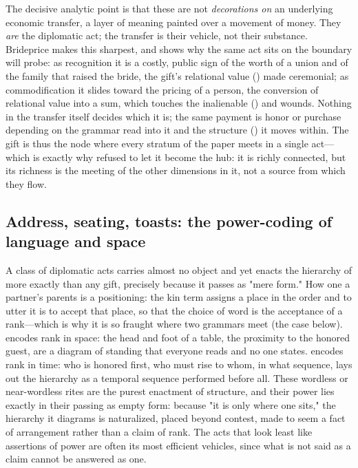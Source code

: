 The decisive analytic point is that these are not \emph{decorations on} an underlying economic transfer, a layer of meaning painted over a movement of money. They \emph{are} the diplomatic act; the transfer is their vehicle, not their substance. Brideprice makes this sharpest, and shows why the same act sits on the boundary  will probe: as recognition it is a costly, public sign of the worth of a union and of the family that raised the bride, the gift's relational value () made ceremonial; as commodification it slides toward the pricing of a person, the conversion of relational value into a sum, which touches the inalienable () and wounds. Nothing in the transfer itself decides which it is; the same payment is honor or purchase depending on the grammar read into it and the structure () it moves within. The gift is thus the node where every stratum of the paper meets in a single act---which is exactly why  refused to let it become the hub: it is richly connected, but its richness is the meeting of the other dimensions in it, not a source from which they flow.

\subsection{Address, seating, toasts: the power-coding of language and space}
A class of diplomatic acts carries almost no object and yet enacts the hierarchy of  more exactly than any gift, precisely because it passes as "mere form." How one  a partner's parents is a positioning: the kin term assigns a place in the order and to utter it is to accept that place, so that the choice of word is the acceptance of a rank---which is why it is so fraught where two grammars meet (the case below).  encodes rank in space: the head and foot of a table, the proximity to the honored guest, are a diagram of standing that everyone reads and no one states.  encodes rank in time: who is honored first, who must rise to whom, in what sequence, lays out the hierarchy as a temporal sequence performed before all. These wordless or near-wordless rites are the purest enactment of structure, and their power lies exactly in their passing as empty form: because "it is only where one sits," the hierarchy it diagrams is naturalized, placed beyond contest, made to seem a fact of arrangement rather than a claim of rank. The acts that look least like assertions of power are often its most efficient vehicles, since what is not said as a claim cannot be answered as one.


